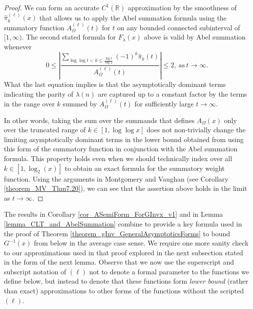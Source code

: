 \documentclass[11pt,reqno,a4letter]{article}
\numberwithin{figure}{section}
\numberwithin{table}{section}
\theoremstyle{plain}
\numberwithin{theorem}{section}
\theoremstyle{definition}
\begin{document}
\begin{proof} 
We can form an accurate $C^{1}(\mathbb{R})$ approximation by the smoothness of 
$\widehat{\pi}_k^{(\ell)}(x)$ that allows us to apply the Abel summation formula using the summatory 
function $A_{\Omega}^{(\ell)}(t)$ for $t$ on any bounded connected subinterval of $[1, \infty)$. 
The second stated formula for $F_{\lambda}(x)$ above is valid by Abel summation whenever 
\[
0 \leq \left\lvert \frac{\displaystyle\sum\limits_{\log\log t < k \leq \frac{\log t}{\log 2}} 
     (-1)^k \widehat{\pi}_k(t)}{A_{\Omega}^{(\ell)}(t)}\right\rvert \leq 2, 
     \mathrm{\ as\ } t \rightarrow \infty. 
\]
What the last equation implies is that the asymptotically dominant terms indicating the parity of 
$\lambda(n)$ are captured up to a constant factor 
by the terms in the range over $k$ summed by 
$A_{\Omega}^{(\ell)}(t)$ for 
sufficiently large $t \rightarrow \infty$. 

In other words, taking the sum over the summands that defines $A_{\Omega}(x)$ only over the truncated range of 
$k \in [1, \log\log x]$ does not non-trivially change the limiting asymptotically 
dominant terms in the lower bound obtained from using this form of the summatory function in 
conjunction with the Abel summation formula. This property holds even when we should technically 
index over all $k \in [1, \log_2(x)]$ to obtain an exact formula for the summatory weight function. 
Using the arguments in Montgomery and Vaughan \cite[\S 7; Thm.\ 7.20]{MV} (see 
Corollary \ref{theorem_MV_Thm7.20}), we can see that 
the assertion above holds in the limit as $t \rightarrow \infty$. 
\end{proof} 

The results in Corollary \ref{cor_ASemiForm_ForGInvx_v1} and in 
Lemma \ref{lemma_CLT_and_AbelSummation} combine to provide a key formula used in the 
proof of Theorem \ref{theorem_gInv_GeneralAsymptoticsForms} to bound $G^{-1}(x)$ from 
below in the average case sense. We require one more sanity check to our approximations 
used in that proof explored in the next subsection stated in the form of the next lemma. 
Observe that we now use the superscript and subscript notation of 
$(\ell)$ not to denote a formal parameter to 
the functions we define below, but instead to denote that these functions form 
\emph{lower bound} (rather than exact) 
approximations to other forms of the functions without the scripted $(\ell)$. 
\end{document}
